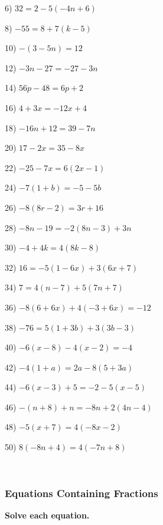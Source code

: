 \documentclass[11pt]{book}
\newcommand{\tmstrong}[1]{\textbf{#1}}
\theoremstyle{definition}  %
\begin{document}
\begin{multicols}{2}
  6) $32 = 2 - 5 (- 4 n + 6)$
  
  8) $- 55 = 8 + 7 (k - 5)$
  
  10) $- (3 - 5 n) = 12$
  
  12) $- 3 n - 27 = - 27 - 3 n$
  
  14) $56 p - 48 = 6 p + 2$
  
  16) $4 + 3 x = - 12 x + 4$
  
  18) $- 16 n + 12 = 39 - 7 n$
  
  20) $17 - 2 x = 35 - 8 x$
  
  22) $- 25 - 7 x = 6 (2 x - 1)$
  
  24) $- 7 (1 + b) = - 5 - 5 b$
  
  26) $- 8 (8 r - 2) = 3 r + 16$
  
  28) $- 8 n - 19 = - 2 (8 n - 3) + 3 n$
  
  30) $- 4 + 4 k = 4 (8 k - 8)$
  
  32) $16 = - 5 (1 - 6 x) + 3 (6 x + 7)$
  
  34) $7 = 4 (n - 7) + 5 (7 n + 7)$
  
  36) $- 8 (6 + 6 x) + 4 (- 3 + 6 x) = - 12$
  
  38) $- 76 = 5 (1 + 3 b) + 3 (3 b - 3)$
  
  40) $- 6 (x - 8) - 4 (x - 2) = - 4$
  
  42) $- 4 (1 + a) = 2 a - 8 (5 + 3 a) $
  
  44) $- 6 (x - 3) + 5 = - 2 - 5 (x - 5)$
  
  46) $- (n + 8) + n = - 8 n + 2 (4 n - 4)$
  
  48) $- 5 (x + 7) = 4 (- 8 x - 2)$
  
  50) $8 (- 8 n + 4) = 4 (- 7 n + 8)$
\end{multicols}

\vspace{1.5in}
~

\pagebreak

\subsubsection{Equations Containing Fractions}\par

{\tmstrong{Solve each equation.}}
\end{document}
